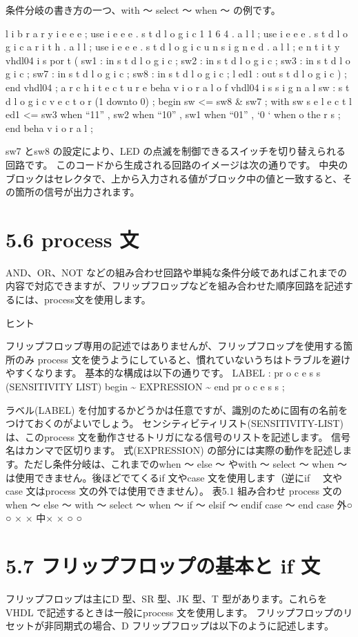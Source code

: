 \documentclass[letterpaper,10pt,dvipdfmx]{sphinxmanual}
\begin{document}
条件分岐の書き方の一つ、with ～ select ～ when ～ の例です。

l i b r a r y i e e e ;
use i e e e . s t d l o g i c 1 1 6 4 . a l l ;
use i e e e . s t d l o g i c a r i t h . a l l ;
use i e e e . s t d l o g i c u n s i g n e d . a l l ;
e n t i t y vhdl04 i s
por t (
sw1 : in s t d l o g i c ;
sw2 : in s t d l o g i c ;
sw3 : in s t d l o g i c ;
sw7 : in s t d l o g i c ;
sw8 : in s t d l o g i c ;
l ed1 : out s t d l o g i c
) ;
end vhdl04 ;
a r c h i t e c t u r e beha v i o r a l o f vhdl04 i s
s i g n a l sw : s t d l o g i c v e c t o r (1 downto 0) ;
begin
sw \textless{}= sw8 \& sw7 ;
with sw s e l e c t l ed1 \textless{}= sw3 when ``11'' ,
sw2 when ``10'' ,
sw1 when ``01'' ,
`0 ` when o the r s ;
end beha v i o r a l ;

sw7 とsw8 の設定により、LED の点滅を制御できるスイッチを切り替えられる回路です。
このコードから生成される回路のイメージは次の通りです。
中央のブロックはセレクタで、上から入力される値がブロック中の値と一致すると、そ
の箇所の信号が出力されます。


\section{5.6 process 文}
\label{05_try:process}
AND、OR、NOT などの組み合わせ回路や単純な条件分岐であればこれまでの内容で対応できますが、フリップフロップなどを組み合わせた順序回路を記述するには、process文を使用します。

ヒント

フリップフロップ専用の記述ではありませんが、フリップフロップを使用する箇所のみ
process 文を使うようにしていると、慣れていないうちはトラブルを避けやすくなります。
基本的な構成は以下の通りです。
LABEL : pr o c e s s (SENSITIVITY LIST)
begin
\textasciitilde{} EXPRESSION \textasciitilde{}
end pr o c e s s ;

ラベル(LABEL) を付加するかどうかは任意ですが、識別のために固有の名前をつけておくのがよいでしょう。
センシティビティリスト(SENSITIVITY-LIST) は、このprocess 文を動作させるトリガになる信号のリストを記述します。
信号名はカンマで区切ります。
式(EXPRESSION) の部分には実際の動作を記述します。ただし条件分岐は、これまでのwhen ～ else ～ やwith ～ select ～ when ～ は使用できません。後ほどでてくるif 文やcase 文を使用します（逆にif 　文やcase 文はprocess 文の外では使用できません）。
表5.1 組み合わせ
process 文のwhen ～ else ～ with ～ select ～ when ～ if ～ elsif ～ endif case ～ end case
外○ ○ × ×
中× × ○ ○


\section{5.7 フリップフロップの基本と if 文}
\label{05_try:if}
フリップフロップは主にD 型、SR 型、JK 型、T 型があります。これらをVHDL で記述するときは一般にprocess 文を使用します。
フリップフロップのリセットが非同期式の場合、D フリップフロップは以下のように記述します。
\end{document}
